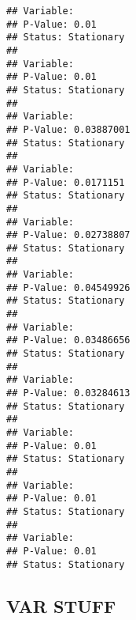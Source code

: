 \documentclass[
]{article}
\newenvironment{Shaded}{\begin{snugshade}}{\end{snugshade}}
\newcommand{\ControlFlowTok}[1]{\textcolor[rgb]{0.13,0.29,0.53}{\textbf{#1}}}
\newcommand{\FloatTok}[1]{\textcolor[rgb]{0.00,0.00,0.81}{#1}}
\newcommand{\FunctionTok}[1]{\textcolor[rgb]{0.13,0.29,0.53}{\textbf{#1}}}
\newcommand{\NormalTok}[1]{#1}
\newcommand{\OtherTok}[1]{\textcolor[rgb]{0.56,0.35,0.01}{#1}}
\newcommand{\SpecialCharTok}[1]{\textcolor[rgb]{0.81,0.36,0.00}{\textbf{#1}}}
\newcommand{\StringTok}[1]{\textcolor[rgb]{0.31,0.60,0.02}{#1}}
\begin{document}
\begin{Shaded}
\end{Shaded}

\begin{verbatim}
## Variable: 
## P-Value: 0.01 
## Status: Stationary 
## 
## Variable: 
## P-Value: 0.01 
## Status: Stationary 
## 
## Variable: 
## P-Value: 0.03887001 
## Status: Stationary 
## 
## Variable: 
## P-Value: 0.0171151 
## Status: Stationary 
## 
## Variable: 
## P-Value: 0.02738807 
## Status: Stationary 
## 
## Variable: 
## P-Value: 0.04549926 
## Status: Stationary 
## 
## Variable: 
## P-Value: 0.03486656 
## Status: Stationary 
## 
## Variable: 
## P-Value: 0.03284613 
## Status: Stationary 
## 
## Variable: 
## P-Value: 0.01 
## Status: Stationary 
## 
## Variable: 
## P-Value: 0.01 
## Status: Stationary 
## 
## Variable: 
## P-Value: 0.01 
## Status: Stationary
\end{verbatim}

\hypertarget{var-stuff}{%
\subsection{VAR STUFF}\label{var-stuff}}
\end{document}
